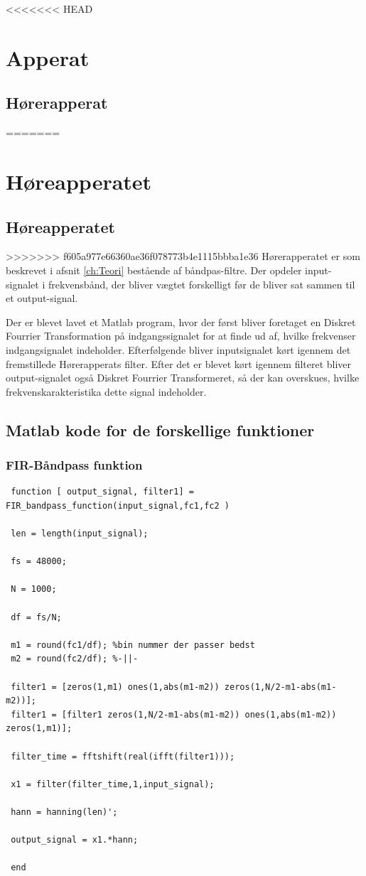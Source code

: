 <<<<<<< HEAD
\chapter{Apperat}\label{ch:Apperat}
\section{Hørerapperat}
=======
\chapter{Høreapperatet}\label{ch:apperatet}
\section{Høreapperatet}
>>>>>>> f605a977e66360ae36f078773b4e1115bbba1e36
Hørerapperatet er som beskrevet i afsnit \ref{ch:Teori} bestående af båndpas-filtre. Der opdeler input-signalet i frekvensbånd, der bliver vægtet forskelligt før de bliver sat sammen til et output-signal.

Der er blevet lavet et Matlab program, hvor der først bliver foretaget en Diskret Fourrier Transformation på indgangssignalet for at finde ud af, hvilke frekvenser indgangsignalet indeholder.
Efterfølgende bliver inputsignalet kørt igennem det fremstillede Hørerapperats filter. Efter det er blevet kørt igennem filteret bliver output-signalet også Diskret Fourrier Transformeret, så der kan overskues, hvilke frekvenskarakteristika dette signal indeholder.
\section{Matlab kode for de forskellige funktioner}
\subsection{FIR-Båndpass funktion}
 \begin{verbatim}
 function [ output_signal, filter1] = FIR_bandpass_function(input_signal,fc1,fc2 )
 
 len = length(input_signal);
 
 fs = 48000;
 
 N = 1000;
 
 df = fs/N;
 
 m1 = round(fc1/df); %bin nummer der passer bedst
 m2 = round(fc2/df); %-||-
 
 filter1 = [zeros(1,m1) ones(1,abs(m1-m2)) zeros(1,N/2-m1-abs(m1-m2))];
 filter1 = [filter1 zeros(1,N/2-m1-abs(m1-m2)) ones(1,abs(m1-m2)) zeros(1,m1)];
 
 filter_time = fftshift(real(ifft(filter1)));
 
 x1 = filter(filter_time,1,input_signal);
 
 hann = hanning(len)';
 
 output_signal = x1.*hann;
 
 end
 \end{verbatim}

